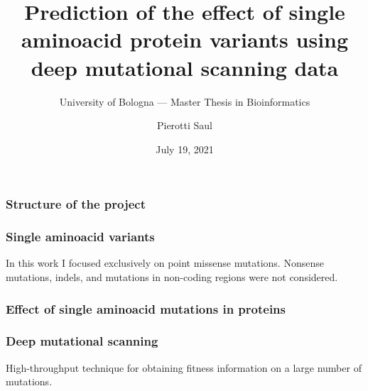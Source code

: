 \documentclass[10pt, british]{beamer}
\title[Single aminoacid variants prediction]{Prediction of the effect of single aminoacid protein
	variants using deep mutational scanning data}
\subtitle[]{University of Bologna --- Master Thesis in Bioinformatics}
\author[Pierotti Saul]{Pierotti Saul}
\date{July 19, 2021}
\begin{document}
\begin{frame}[plain]
	\titlepage%
\end{frame}

\begin{frame}
	\frametitle{Structure of the project}
	\begin{figure}
		
	\end{figure}
\end{frame}

\begin{frame}
	\frametitle{Single aminoacid variants}
	In this work I focused exclusively on point missense mutations.
	Nonsense mutations, indels, and mutations in non-coding regions were not considered.
	\vfill%
	\begin{figure}
		
	\end{figure}
\end{frame}

\begin{frame}
	\frametitle{Effect of single aminoacid mutations in proteins}
	\begin{figure}
		
	\end{figure}
\end{frame}

\begin{frame}
	\frametitle{Deep mutational scanning}
	High-throughput technique for obtaining fitness information on a large number of mutations.
	\vfill%
	\begin{figure}
		
	\end{figure}
\end{frame}
\end{document}
